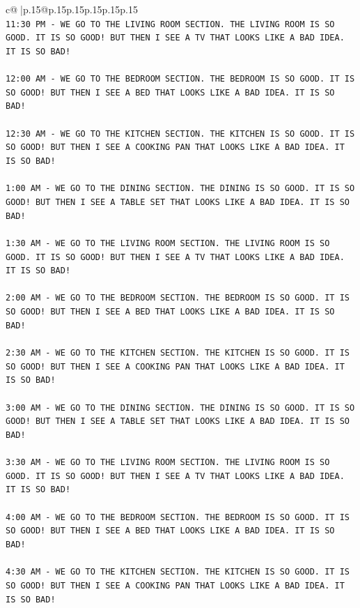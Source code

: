 \documentclass{article}
\begin{document}
{\begin{supertabular}{c@{$\;$}|p{.15\linewidth}@{}p{.15\linewidth}p{.15\linewidth}p{.15\linewidth}p{.15\linewidth}p{.15\linewidth}}
{{{\\ 
\texttt{11:30 PM {-} WE GO TO THE LIVING ROOM SECTION. THE LIVING ROOM IS SO GOOD. IT IS SO GOOD! BUT THEN I SEE A TV THAT LOOKS LIKE A BAD IDEA. IT IS SO BAD!} \\
\\ 
\texttt{12:00 AM {-} WE GO TO THE BEDROOM SECTION. THE BEDROOM IS SO GOOD. IT IS SO GOOD! BUT THEN I SEE A BED THAT LOOKS LIKE A BAD IDEA. IT IS SO BAD!} \\
\\ 
\texttt{12:30 AM {-} WE GO TO THE KITCHEN SECTION. THE KITCHEN IS SO GOOD. IT IS SO GOOD! BUT THEN I SEE A COOKING PAN THAT LOOKS LIKE A BAD IDEA. IT IS SO BAD!} \\
\\ 
\texttt{1:00 AM {-} WE GO TO THE DINING SECTION. THE DINING IS SO GOOD. IT IS SO GOOD! BUT THEN I SEE A TABLE SET THAT LOOKS LIKE A BAD IDEA. IT IS SO BAD!} \\
\\ 
\texttt{1:30 AM {-} WE GO TO THE LIVING ROOM SECTION. THE LIVING ROOM IS SO GOOD. IT IS SO GOOD! BUT THEN I SEE A TV THAT LOOKS LIKE A BAD IDEA. IT IS SO BAD!} \\
\\ 
\texttt{2:00 AM {-} WE GO TO THE BEDROOM SECTION. THE BEDROOM IS SO GOOD. IT IS SO GOOD! BUT THEN I SEE A BED THAT LOOKS LIKE A BAD IDEA. IT IS SO BAD!} \\
\\ 
\texttt{2:30 AM {-} WE GO TO THE KITCHEN SECTION. THE KITCHEN IS SO GOOD. IT IS SO GOOD! BUT THEN I SEE A COOKING PAN THAT LOOKS LIKE A BAD IDEA. IT IS SO BAD!} \\
\\ 
\texttt{3:00 AM {-} WE GO TO THE DINING SECTION. THE DINING IS SO GOOD. IT IS SO GOOD! BUT THEN I SEE A TABLE SET THAT LOOKS LIKE A BAD IDEA. IT IS SO BAD!} \\
\\ 
\texttt{3:30 AM {-} WE GO TO THE LIVING ROOM SECTION. THE LIVING ROOM IS SO GOOD. IT IS SO GOOD! BUT THEN I SEE A TV THAT LOOKS LIKE A BAD IDEA. IT IS SO BAD!} \\
\\ 
\texttt{4:00 AM {-} WE GO TO THE BEDROOM SECTION. THE BEDROOM IS SO GOOD. IT IS SO GOOD! BUT THEN I SEE A BED THAT LOOKS LIKE A BAD IDEA. IT IS SO BAD!} \\
\\ 
\texttt{4:30 AM {-} WE GO TO THE KITCHEN SECTION. THE KITCHEN IS SO GOOD. IT IS SO GOOD! BUT THEN I SEE A COOKING PAN THAT LOOKS LIKE A BAD IDEA. IT IS SO BAD!} \\
}}}
\end{supertabular}}
\end{document}
